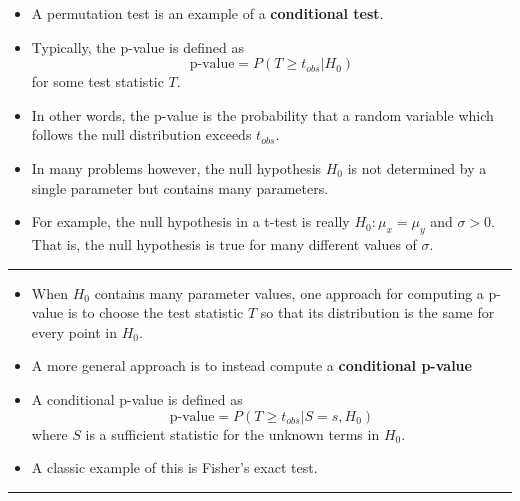 \documentclass[]{book}
\begin{document}
\begin{itemize}
\item
  A permutation test is an example of a \textbf{conditional test}.
\item
  Typically, the p-value is defined as
  \begin{equation}
  \textrm{p-value} = P(T \geq t_{obs}|H_{0})
  \end{equation}
  for some test statistic \(T\).
\item
  In other words, the p-value is the probability
  that a random variable which follows the null distribution
  exceeds \(t_{obs}\).
\item
  In many problems however, the null hypothesis \(H_{0}\) is
  not determined by a single parameter but contains
  many parameters.
\item
  For example, the null hypothesis in a t-test is
  really \(H_{0}: \mu_{x} = \mu_{y}\) and \(\sigma > 0\).
  That is, the null hypothesis is true for many different values of \(\sigma\).
\end{itemize}

\begin{center}\rule{0.5\linewidth}{\linethickness}\end{center}

\begin{itemize}
\item
  When \(H_{0}\) contains many parameter values, one approach for computing
  a p-value is to choose the test statistic \(T\) so that its
  distribution is the same for every point in \(H_{0}\).
\item
  A more general approach is to instead compute a \textbf{conditional p-value}
\item
  A conditional p-value is defined as
  \begin{equation}
  \textrm{p-value} = P(T \geq t_{obs}| S=s, H_{0})  \nonumber
  \end{equation}
  where \(S\) is a sufficient statistic for the unknown terms in \(H_{0}\).
\item
  A classic example of this is Fisher's exact test.
\end{itemize}

\begin{center}\rule{0.5\linewidth}{\linethickness}\end{center}
\end{document}
